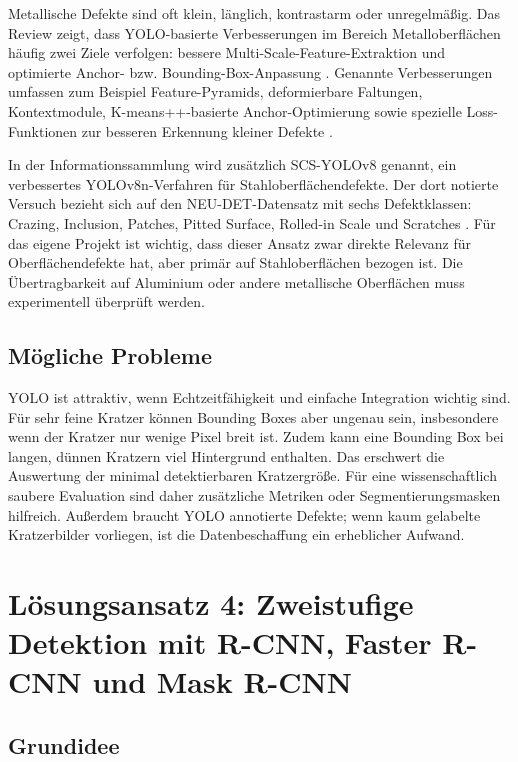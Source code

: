 \documentclass[11pt,a4paper]{article}
\begin{document}
Metallische Defekte sind oft klein, länglich, kontrastarm oder unregelmäßig. Das Review zeigt, dass YOLO-basierte Verbesserungen im Bereich Metalloberflächen häufig zwei Ziele verfolgen: bessere Multi-Scale-Feature-Extraktion und optimierte Anchor- bzw. Bounding-Box-Anpassung \cite{applications_review}. Genannte Verbesserungen umfassen zum Beispiel Feature-Pyramids, deformierbare Faltungen, Kontextmodule, K-means++-basierte Anchor-Optimierung sowie spezielle Loss-Funktionen zur besseren Erkennung kleiner Defekte \cite{applications_review}. 

In der Informationssammlung wird zusätzlich SCS-YOLOv8 genannt, ein verbessertes YOLOv8n-Verfahren für Stahloberflächendefekte. Der dort notierte Versuch bezieht sich auf den NEU-DET-Datensatz mit sechs Defektklassen: Crazing, Inclusion, Patches, Pitted Surface, Rolled-in Scale und Scratches \cite{ersteinfos,scs_yolov8}. Für das eigene Projekt ist wichtig, dass dieser Ansatz zwar direkte Relevanz für Oberflächendefekte hat, aber primär auf Stahloberflächen bezogen ist. Die Übertragbarkeit auf Aluminium oder andere metallische Oberflächen muss experimentell überprüft werden.

\subsection{Mögliche Probleme}

YOLO ist attraktiv, wenn Echtzeitfähigkeit und einfache Integration wichtig sind. Für sehr feine Kratzer können Bounding Boxes aber ungenau sein, insbesondere wenn der Kratzer nur wenige Pixel breit ist. Zudem kann eine Bounding Box bei langen, dünnen Kratzern viel Hintergrund enthalten. Das erschwert die Auswertung der minimal detektierbaren Kratzergröße. Für eine wissenschaftlich saubere Evaluation sind daher zusätzliche Metriken oder Segmentierungsmasken hilfreich. Außerdem braucht YOLO annotierte Defekte; wenn kaum gelabelte Kratzerbilder vorliegen, ist die Datenbeschaffung ein erheblicher Aufwand.

\section{Lösungsansatz 4: Zweistufige Detektion mit R-CNN, Faster R-CNN und Mask R-CNN}

\subsection{Grundidee}
\end{document}
